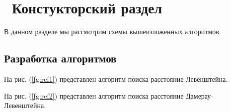 \chapter{ Констукторский раздел}
\label{cha:design}

В данном разделе мы рассмотрим схемы вышеизложенных алгоритмов.


\section{Разработка алгоритмов}



На рис. (\ref{fg:ref1}) представлен алгоритм поиска расстояние Левенштейна.

\begin{figure}[ht!]
\end{figure}

На рис. (\ref{fg:ref2}) представлен алгоритм поиска расстояние Дамерау-Левенштейна.

